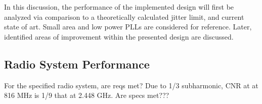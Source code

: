 In this discussion, the performance of the implemented design will first be analyzed via comparison to a theoretically calculated jitter limit, and current state of art. Small area and low power PLLs are considered for reference. Later, identified areas of improvement within the presented design are discussed.

\subsection{Radio System Performance}
	For the specified radio system, are reqs met? Due to 1/3 subharmonic, CNR at at 816 MHz is 1/9 that at 2.448 GHz. Are specs met???

